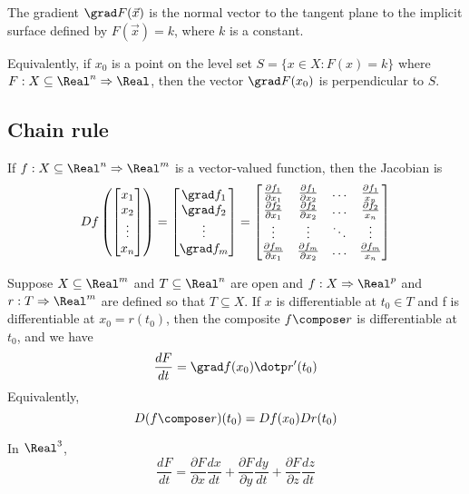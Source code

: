 \begin{theorem}
  The gradient $\grad F(\vec{x})$ is the normal vector to the tangent plane to the implicit surface defined by $F(\vec{x}) = k$, where $k$ is a constant.

  Equivalently, if $x_0$ is a point on the level set $S = \{ x \in X : F(x) = k \}$ where $F : X \subseteq \Real^n \Rightarrow \Real$, then the vector $\grad F(x_0)$ is perpendicular to $S$.
\end{theorem}

\subsection{Chain rule}


\begin{definition}[Jacobian]
  If $f: X \subseteq \Real^n \Rightarrow \Real^m$ is a vector-valued function, then the Jacobian is
  \[
    Df\left(\begin{bmatrix}
      x_1 \\
      x_2 \\
      \vdots \\
      x_n
    \end{bmatrix}\right) = \begin{bmatrix}
      \grad f_1 \\
      \grad f_2 \\
      \vdots \\
      \grad f_m
    \end{bmatrix} = \begin{bmatrix}
      \frac{\partial f_1}{\partial x_1} & \frac{\partial f_1}{\partial x_2} & \hdots & \frac{\partial f_1}{x_n} \\
      \frac{\partial f_2}{\partial x_1} & \frac{\partial f_2}{\partial x_2} & \hdots & \frac{\partial f_2}{x_n} \\
      \vdots & \vdots & \ddots & \vdots \\
      \frac{\partial f_m}{\partial x_1} & \frac{\partial f_m}{\partial x_2} & \hdots & \frac{\partial f_m}{x_n} \\
    \end{bmatrix}
  \]
\end{definition}

\begin{theorem}
  Suppose $X \subseteq \Real^m$ and $T \subseteq \Real^n$ are open and $f : X \Rightarrow \Real^p$ and
  $r : T \Rightarrow \Real^m$ are defined so that $T \subseteq X$. If $x$ is
  differentiable at $t_0 \in T$ and f is differentiable at $x_0 = r(t_0)$, then
  the composite $f \compose r$ is differentiable at $t_0$, and we have
  \[
    \frac{dF}{dt} = \grad f(x_0) \dotp r'(t_0)
  \]
  Equivalently,
  \[
    D(f \compose r)(t_0) = Df(x_0) Dr(t_0)
  \]

  In $\Real^3$,
  \[
    \frac{dF}{dt} = \frac{\partial F}{\partial x} \frac{dx}{dt} + \frac{\partial F}{\partial y} \frac{dy}{dt} + \frac{\partial F}{\partial z} \frac{dz}{dt}
  \]
\end{theorem}

